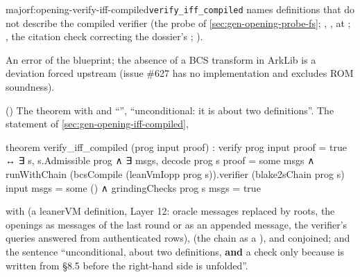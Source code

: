 \begin{finding}{major}{f:opening-verify-iff-compiled}{\texttt{verify\_iff\_compiled} names definitions that do not describe the compiled verifier}
  (the probe of \cref{sec:gen-opening-probe-fs};
, ,  at
; , the citation check correcting the
dossier's ; ).

 An error of the blueprint; the absence of a BCS transform in ArkLib is a
deviation forced upstream (issue \#627 has no implementation and excludes ROM soundness).

\begin{change}{ ()}
\asis The theorem with  and ``'',
``unconditional: it is about two definitions''.
\asproposed The statement of \cref{sec:gen-opening-iff-compiled},
\begin{leancode}
theorem verify_iff_compiled (prog input proof) :
    verify prog input proof = true ↔
      ∃ s, s.Admissible prog ∧ ∃ msgs, decode prog s proof = some msgs ∧
        runWithChain (bcsCompile (leanVmIopp prog s)).verifier (blake2sChain prog s) input msgs
          = some () ∧ grindingChecks prog s msgs = true
\end{leancode}
with  (a leanerVM definition, Layer 12: oracle messages replaced by roots, the
openings as messages of the last round or as an appended message, the verifier's queries answered
from authenticated rows),  (the chain as a ), and
 conjoined; and the sentence ``unconditional, about two definitions,
\textbf{and} a check only because  is written from §8.5 before the right-hand side is
unfolded''.
\end{change}
\end{finding}

